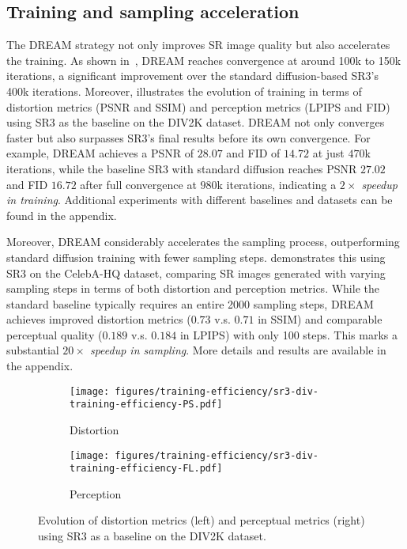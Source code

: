 \subsection{Training and sampling acceleration}

The DREAM strategy not only improves SR image quality but also accelerates the training.  As shown in~, DREAM reaches convergence at around 100k to 150k iterations, a significant improvement over the standard diffusion-based SR3's 400k iterations. Moreover,  illustrates the  evolution of training in terms of distortion metrics (PSNR and SSIM) and perception metrics (LPIPS and FID) using SR3 as the baseline on the DIV2K dataset. DREAM not only converges faster but also surpasses SR3’s final results before its own convergence. For example, DREAM achieves a PSNR of $28.07$ and FID of $14.72$ at just $470$k iterations, while the baseline SR3 with standard diffusion reaches PSNR $27.02$ and FID $16.72$ after full convergence at $980$k iterations, indicating a \emph{$2\times$ speedup in training}.  Additional experiments with different baselines and datasets can be found in the appendix.


Moreover, DREAM considerably accelerates the sampling process, outperforming standard diffusion training with fewer sampling steps.   demonstrates this using SR3 on the CelebA-HQ dataset, comparing SR images generated with varying sampling steps in terms of both distortion and perception metrics. While the standard baseline typically requires an entire 2000 sampling steps, DREAM achieves improved distortion metrics  ($0.73$ v.s. $0.71$ in SSIM) and comparable perceptual quality ($0.189$ v.s. $0.184$ in LPIPS) with only 100 steps. This marks a substantial \emph{$20\times$ speedup in sampling}. More details and results are available in the appendix. 


\begin{figure}[t]
     \centering
     \begin{subfigure}[b]{0.23\textwidth}
         \centering
         \texttt{[image: figures/training-efficiency/sr3-div-training-efficiency-PS.pdf]}
         \caption{Distortion}
         \label{fig:training-ps}
     \end{subfigure}
     \begin{subfigure}[b]{0.242\textwidth}
         \centering
         \texttt{[image: figures/training-efficiency/sr3-div-training-efficiency-FL.pdf]}
         \caption{Perception}
         \label{fig:training-fl}
     \end{subfigure}
     \vspace{-.28in}
         \caption{Evolution of distortion metrics (left) and perceptual metrics (right) using SR3 as a baseline on the DIV2K dataset.}
        \label{fig:training}
        \vspace{-.1in}
\end{figure}



